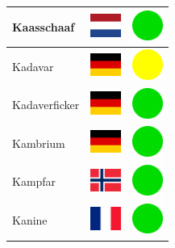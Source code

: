 \documentclass[12pt, a4paper, twoside]{report}
\begin{document}
\begin{center}
\begin{longtable}{|p{5cm}|p{2cm}|p{2cm}|}
 Kaasschaaf                                                 & \includegraphics[width=1cm]{../img/flags/nl} &   \includegraphics[width=1cm]{../likes/y} \\ \hline
 Kadavar                                                    & \includegraphics[width=1cm]{../img/flags/de} &   \includegraphics[width=1cm]{../likes/m} \\ \hline
 Kadaverficker                                              & \includegraphics[width=1cm]{../img/flags/de} &   \includegraphics[width=1cm]{../likes/y} \\ \hline
 Kambrium                                                   & \includegraphics[width=1cm]{../img/flags/de} &   \includegraphics[width=1cm]{../likes/y} \\ \hline
 Kampfar                                                    & \includegraphics[width=1cm]{../img/flags/no} &   \includegraphics[width=1cm]{../likes/y} \\ \hline
 Kanine                                                     & \includegraphics[width=1cm]{../img/flags/fr} &   \includegraphics[width=1cm]{../likes/y} \\ \hline

\end{longtable}
\end{center}
\end{document}
